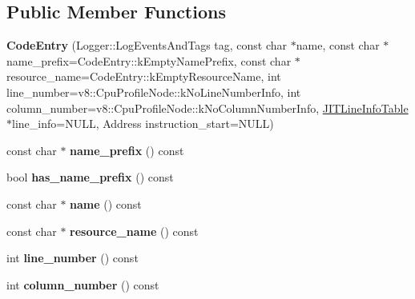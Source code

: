 \subsection*{Public Member Functions}
\begin{DoxyCompactItemize}
\item 
{\bfseries Code\+Entry} (Logger\+::\+Log\+Events\+And\+Tags tag, const char $\ast$name, const char $\ast$name\+\_\+prefix=Code\+Entry\+::k\+Empty\+Name\+Prefix, const char $\ast$resource\+\_\+name=Code\+Entry\+::k\+Empty\+Resource\+Name, int line\+\_\+number=v8\+::\+Cpu\+Profile\+Node\+::k\+No\+Line\+Number\+Info, int column\+\_\+number=v8\+::\+Cpu\+Profile\+Node\+::k\+No\+Column\+Number\+Info, \hyperlink{classv8_1_1internal_1_1_j_i_t_line_info_table}{J\+I\+T\+Line\+Info\+Table} $\ast$line\+\_\+info=N\+U\+LL, Address instruction\+\_\+start=N\+U\+LL)\hypertarget{classv8_1_1internal_1_1_code_entry_ad75e9ed8bb8ca5ea5f84e9fcd13860ed}{}\label{classv8_1_1internal_1_1_code_entry_ad75e9ed8bb8ca5ea5f84e9fcd13860ed}

\item 
const char $\ast$ {\bfseries name\+\_\+prefix} () const \hypertarget{classv8_1_1internal_1_1_code_entry_aeebf1e565b958ea8392e5ca300c363c9}{}\label{classv8_1_1internal_1_1_code_entry_aeebf1e565b958ea8392e5ca300c363c9}

\item 
bool {\bfseries has\+\_\+name\+\_\+prefix} () const \hypertarget{classv8_1_1internal_1_1_code_entry_a880727acffb491d0b8ddf0d383b5c1af}{}\label{classv8_1_1internal_1_1_code_entry_a880727acffb491d0b8ddf0d383b5c1af}

\item 
const char $\ast$ {\bfseries name} () const \hypertarget{classv8_1_1internal_1_1_code_entry_ab1909db2ac67812339659a7334e67306}{}\label{classv8_1_1internal_1_1_code_entry_ab1909db2ac67812339659a7334e67306}

\item 
const char $\ast$ {\bfseries resource\+\_\+name} () const \hypertarget{classv8_1_1internal_1_1_code_entry_a9f71cda7e74daf7c82dc9211f9a3710b}{}\label{classv8_1_1internal_1_1_code_entry_a9f71cda7e74daf7c82dc9211f9a3710b}

\item 
int {\bfseries line\+\_\+number} () const \hypertarget{classv8_1_1internal_1_1_code_entry_a194b7482348ab3bf1a272a3e2cb728bd}{}\label{classv8_1_1internal_1_1_code_entry_a194b7482348ab3bf1a272a3e2cb728bd}

\item 
int {\bfseries column\+\_\+number} () const \hypertarget{classv8_1_1internal_1_1_code_entry_a2329e0ce8c4221f170a65c93556a66d9}{}\label{classv8_1_1internal_1_1_code_entry_a2329e0ce8c4221f170a65c93556a66d9}


\end{DoxyCompactItemize}
